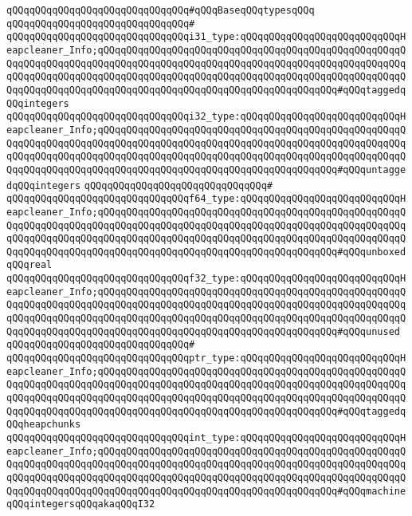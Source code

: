 \newline
\verb|qQQqqQQqqQQqqQQqqQQqqQQqqQQqqQQq#qQQqBaseqQQqtypesqQQq|\newline
\verb|qQQqqQQqqQQqqQQqqQQqqQQqqQQqqQQq#|\newline
\verb|qQQqqQQqqQQqqQQqqQQqqQQqqQQqqQQqi31_type:qQQqqQQqqQQqqQQqqQQqqQQqqQQqHeapcleaner_Info;qQQqqQQqqQQqqQQqqQQqqQQqqQQqqQQqqQQqqQQqqQQqqQQqqQQqqQQqqQQqqQQqqQQqqQQqqQQqqQQqqQQqqQQqqQQqqQQqqQQqqQQqqQQqqQQqqQQqqQQqqQQqqQQqqQQqqQQqqQQqqQQqqQQqqQQqqQQqqQQqqQQqqQQqqQQqqQQqqQQqqQQqqQQqqQQqqQQqqQQqqQQqqQQqqQQqqQQqqQQqqQQqqQQqqQQqqQQqqQQqqQQqqQQqqQQq#qQQqtaggedqQQqintegers|\newline
\verb|qQQqqQQqqQQqqQQqqQQqqQQqqQQqqQQqi32_type:qQQqqQQqqQQqqQQqqQQqqQQqqQQqHeapcleaner_Info;qQQqqQQqqQQqqQQqqQQqqQQqqQQqqQQqqQQqqQQqqQQqqQQqqQQqqQQqqQQqqQQqqQQqqQQqqQQqqQQqqQQqqQQqqQQqqQQqqQQqqQQqqQQqqQQqqQQqqQQqqQQqqQQqqQQqqQQqqQQqqQQqqQQqqQQqqQQqqQQqqQQqqQQqqQQqqQQqqQQqqQQqqQQqqQQqqQQqqQQqqQQqqQQqqQQqqQQqqQQqqQQqqQQqqQQqqQQqqQQqqQQqqQQqqQQq#qQQquntaggedqQQqintegers|\newline
\verb|qQQqqQQqqQQqqQQqqQQqqQQqqQQqqQQq#|\newline
\verb|qQQqqQQqqQQqqQQqqQQqqQQqqQQqqQQqf64_type:qQQqqQQqqQQqqQQqqQQqqQQqqQQqHeapcleaner_Info;qQQqqQQqqQQqqQQqqQQqqQQqqQQqqQQqqQQqqQQqqQQqqQQqqQQqqQQqqQQqqQQqqQQqqQQqqQQqqQQqqQQqqQQqqQQqqQQqqQQqqQQqqQQqqQQqqQQqqQQqqQQqqQQqqQQqqQQqqQQqqQQqqQQqqQQqqQQqqQQqqQQqqQQqqQQqqQQqqQQqqQQqqQQqqQQqqQQqqQQqqQQqqQQqqQQqqQQqqQQqqQQqqQQqqQQqqQQqqQQqqQQqqQQqqQQq#qQQqunboxedqQQqreal|\newline
\verb|qQQqqQQqqQQqqQQqqQQqqQQqqQQqqQQqf32_type:qQQqqQQqqQQqqQQqqQQqqQQqqQQqHeapcleaner_Info;qQQqqQQqqQQqqQQqqQQqqQQqqQQqqQQqqQQqqQQqqQQqqQQqqQQqqQQqqQQqqQQqqQQqqQQqqQQqqQQqqQQqqQQqqQQqqQQqqQQqqQQqqQQqqQQqqQQqqQQqqQQqqQQqqQQqqQQqqQQqqQQqqQQqqQQqqQQqqQQqqQQqqQQqqQQqqQQqqQQqqQQqqQQqqQQqqQQqqQQqqQQqqQQqqQQqqQQqqQQqqQQqqQQqqQQqqQQqqQQqqQQqqQQqqQQq#qQQqunused|\newline
\verb|qQQqqQQqqQQqqQQqqQQqqQQqqQQqqQQq#|\newline
\verb|qQQqqQQqqQQqqQQqqQQqqQQqqQQqqQQqptr_type:qQQqqQQqqQQqqQQqqQQqqQQqqQQqHeapcleaner_Info;qQQqqQQqqQQqqQQqqQQqqQQqqQQqqQQqqQQqqQQqqQQqqQQqqQQqqQQqqQQqqQQqqQQqqQQqqQQqqQQqqQQqqQQqqQQqqQQqqQQqqQQqqQQqqQQqqQQqqQQqqQQqqQQqqQQqqQQqqQQqqQQqqQQqqQQqqQQqqQQqqQQqqQQqqQQqqQQqqQQqqQQqqQQqqQQqqQQqqQQqqQQqqQQqqQQqqQQqqQQqqQQqqQQqqQQqqQQqqQQqqQQqqQQqqQQq#qQQqtaggedqQQqheapchunks|\newline
\verb|qQQqqQQqqQQqqQQqqQQqqQQqqQQqqQQqint_type:qQQqqQQqqQQqqQQqqQQqqQQqqQQqHeapcleaner_Info;qQQqqQQqqQQqqQQqqQQqqQQqqQQqqQQqqQQqqQQqqQQqqQQqqQQqqQQqqQQqqQQqqQQqqQQqqQQqqQQqqQQqqQQqqQQqqQQqqQQqqQQqqQQqqQQqqQQqqQQqqQQqqQQqqQQqqQQqqQQqqQQqqQQqqQQqqQQqqQQqqQQqqQQqqQQqqQQqqQQqqQQqqQQqqQQqqQQqqQQqqQQqqQQqqQQqqQQqqQQqqQQqqQQqqQQqqQQqqQQqqQQqqQQqqQQq#qQQqmachineqQQqintegersqQQqakaqQQqI32|\newline
